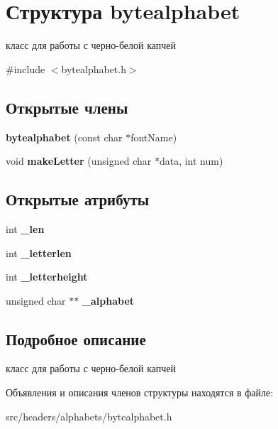 \hypertarget{structbytealphabet}{}\section{Структура bytealphabet}
\label{structbytealphabet}


класс для работы с черно-\/белой капчей  




{\ttfamily \#include $<$bytealphabet.\+h$>$}

\subsection*{Открытые члены}
\begin{DoxyCompactItemize}
\item 
\mbox{\label{structbytealphabet_a1059ff8d34cdc202675b89b359762970}} 
{\bfseries bytealphabet} (const char $\ast$font\+Name)
\item 
\mbox{\label{structbytealphabet_adf79501bb310e5544808429cf2967144}} 
void {\bfseries make\+Letter} (unsigned char $\ast$data, int num)
\end{DoxyCompactItemize}
\subsection*{Открытые атрибуты}
\begin{DoxyCompactItemize}
\item 
\mbox{\label{structbytealphabet_a2998eeef9f96ad39a4383386aeff6a5c}} 
int {\bfseries \+\_\+len}
\item 
\mbox{\label{structbytealphabet_a3b25eb90a29e61adc8b85a8048619002}} 
int {\bfseries \+\_\+letterlen}
\item 
\mbox{\label{structbytealphabet_a922e13a544bdfa47d2b5cfab9e79e0ad}} 
int {\bfseries \+\_\+letterheight}
\item 
\mbox{\label{structbytealphabet_a6a8f7f9d590c89ef3dc29461597f93a6}} 
unsigned char $\ast$$\ast$ {\bfseries \+\_\+alphabet}
\end{DoxyCompactItemize}


\subsection{Подробное описание}
класс для работы с черно-\/белой капчей 

Объявления и описания членов структуры находятся в файле\+:\begin{DoxyCompactItemize}
\item 
src/headers/alphabets/bytealphabet.\+h\end{DoxyCompactItemize}
